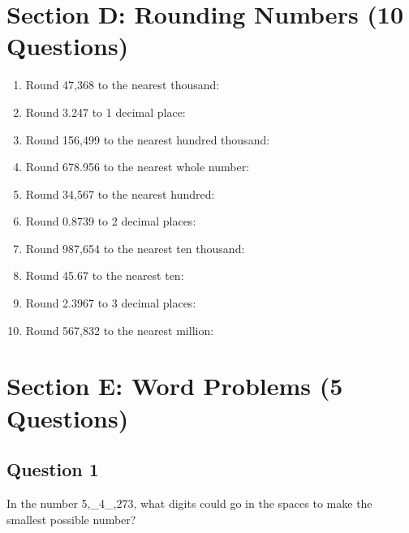 \documentclass{article}
\begin{document}
\section{Section D: Rounding Numbers (10 Questions)}

\begin{enumerate}
    \item Round 47,368 to the nearest thousand: \underline{\hspace{3cm}}
    \item Round 3.247 to 1 decimal place: \underline{\hspace{3cm}}
    \item Round 156,499 to the nearest hundred thousand: \underline{\hspace{3cm}}
    \item Round 678.956 to the nearest whole number: \underline{\hspace{3cm}}
    \item Round 34,567 to the nearest hundred: \underline{\hspace{3cm}}
    \item Round 0.8739 to 2 decimal places: \underline{\hspace{3cm}}
    \item Round 987,654 to the nearest ten thousand: \underline{\hspace{3cm}}
    \item Round 45.67 to the nearest ten: \underline{\hspace{3cm}}
    \item Round 2.3967 to 3 decimal places: \underline{\hspace{3cm}}
    \item Round 567,832 to the nearest million: \underline{\hspace{3cm}}
\end{enumerate}

\section{Section E: Word Problems (5 Questions)}

\subsection*{Question 1}
In the number 5,\_4\_,273, what digits could go in the spaces to make the smallest possible number?

\vspace{2cm}
\end{document}
